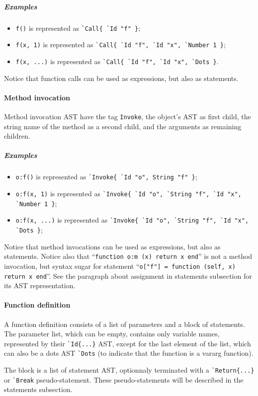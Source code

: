 \subparagraph{Examples}
\begin{itemize}
\item \verb+f()+ is represented as \verb+`Call{ `Id "f" }+;
\item \verb+f(x, 1)+ is represented as
  \verb+`Call{ `Id "f", `Id "x", `Number 1 }+;
\item \verb+f(x, ...)+ is represented as
  \verb+`Call{ `Id "f", `Id "x", `Dots }+.
\end{itemize}

Notice that function calls can be used as expressions, but also as statements. 

\paragraph{Method invocation}
Method invocation AST have the tag \verb+Invoke+, the object's AST as
first child, the string name of the method as a second child, and
the arguments as remaining children.

\subparagraph{Examples}
\begin{itemize}
\item \verb+o:f()+ is represented as \verb+`Invoke{ `Id "o", String "f" }+;
\item \verb+o:f(x, 1)+ is represented as
  \verb+`Invoke{ `Id "o", `String "f", `Id "x", `Number 1 }+;
\item \verb+o:f(x, ...)+ is represented as
  \verb+`Invoke{ `Id "o", `String "f", `Id "x", `Dots }+;
\end{itemize}

Notice that method invocations can be used as expressions, but also as
statements.  Notice also that ``{\tt function o:m (x) return x end}'' is
not a method invocation, but syntax sugar for statement
``{\tt o["f"] = function (self, x) return x end}''. See the paragraph
about assignment in statements subsection for its AST representation.


\paragraph{Function definition}
A function definition consists of a list of parameters and a block of
statements. The parameter list, which can be empty, contains only
variable names, represented by their \verb+`Id{...}+ AST, except for
the last element of the list, which can also be a dots AST \verb+`Dots+
(to indicate that the function is a vararg function).

The block is a list of statement AST, optionnaly terminated with a
\verb+`Return{...}+ or \verb+`Break+ pseudo-statement. These
pseudo-statements will be described in the statements subsection.

